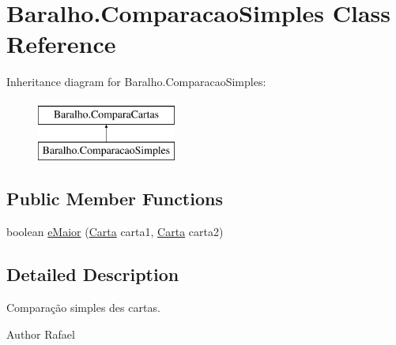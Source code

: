 \hypertarget{class_baralho_1_1_comparacao_simples}{
\section{\-Baralho.\-Comparacao\-Simples \-Class \-Reference}
\label{class_baralho_1_1_comparacao_simples}
}
\-Inheritance diagram for \-Baralho.\-Comparacao\-Simples\-:\begin{figure}[H]
\begin{center}
\leavevmode
\includegraphics[height=2.000000cm]{class_baralho_1_1_comparacao_simples}
\end{center}
\end{figure}
\subsection*{\-Public \-Member \-Functions}
\begin{DoxyCompactItemize}
\item 
boolean \hyperlink{class_baralho_1_1_comparacao_simples_a1ea37c176e2c216536654b64ac8dc883}{e\-Maior} (\hyperlink{class_baralho_1_1_carta}{\-Carta} carta1, \hyperlink{class_baralho_1_1_carta}{\-Carta} carta2)
\end{DoxyCompactItemize}


\subsection{\-Detailed \-Description}
\-Comparação simples des cartas. \begin{DoxyAuthor}{\-Author}
\-Rafael 
\end{DoxyAuthor}


